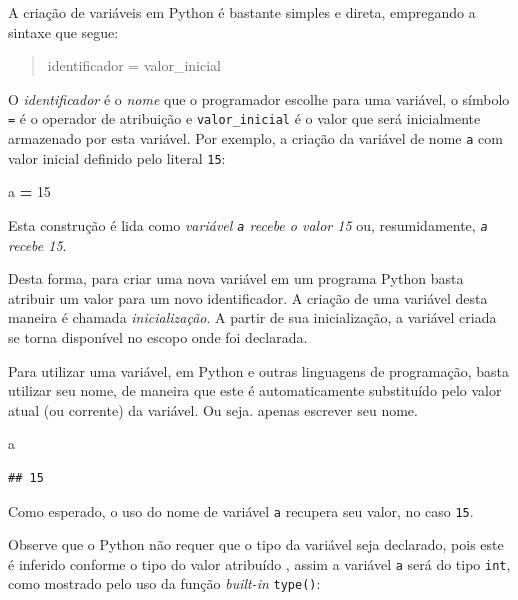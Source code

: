 \documentclass[
]{book}
\newenvironment{Shaded}{\begin{snugshade}}{\end{snugshade}}
\newcommand{\DecValTok}[1]{\textcolor[rgb]{0.00,0.00,0.81}{#1}}
\newcommand{\NormalTok}[1]{#1}
\newcommand{\OperatorTok}[1]{\textcolor[rgb]{0.81,0.36,0.00}{\textbf{#1}}}
\begin{document}
A criação de variáveis em Python é bastante simples e direta, empregando a sintaxe que segue:

\begin{quote}
identificador = valor\_inicial
\end{quote}

O \emph{identificador} é o \emph{nome} que o programador escolhe para uma variável, o símbolo \texttt{=} é o operador de atribuição e \texttt{valor\_inicial} é o valor que será inicialmente armazenado por esta variável. Por exemplo, a criação da variável de nome \texttt{a} com valor inicial definido pelo literal \texttt{15}:

\begin{Shaded}
\begin{Highlighting}[]
\NormalTok{a }\OperatorTok{=} \DecValTok{15}
\end{Highlighting}
\end{Shaded}

Esta construção é lida como \emph{variável \texttt{a} recebe o valor 15} ou, resumidamente, \emph{\texttt{a} recebe 15}.

Desta forma, para criar uma nova variável em um programa Python basta atribuir um valor para um novo identificador. A criação de uma variável desta maneira é chamada \emph{inicialização}. A partir de sua inicialização, a variável criada se torna disponível no escopo onde foi declarada.

Para utilizar uma variável, em Python e outras linguagens de programação, basta utilizar seu nome, de maneira que este é automaticamente substituído pelo valor atual (ou corrente) da variável. Ou seja. apenas escrever seu nome.

\begin{Shaded}
\begin{Highlighting}[]
\NormalTok{a}
\end{Highlighting}
\end{Shaded}

\begin{verbatim}
## 15
\end{verbatim}

Como esperado, o uso do nome de variável \texttt{a} recupera seu valor, no caso \texttt{15}.

Observe que o Python não requer que o tipo da variável seja declarado, pois este é inferido conforme o tipo do valor atribuído , assim a variável \texttt{a} será do tipo \texttt{int}, como mostrado pelo uso da função \emph{built-in} \texttt{type()}:
\end{document}
